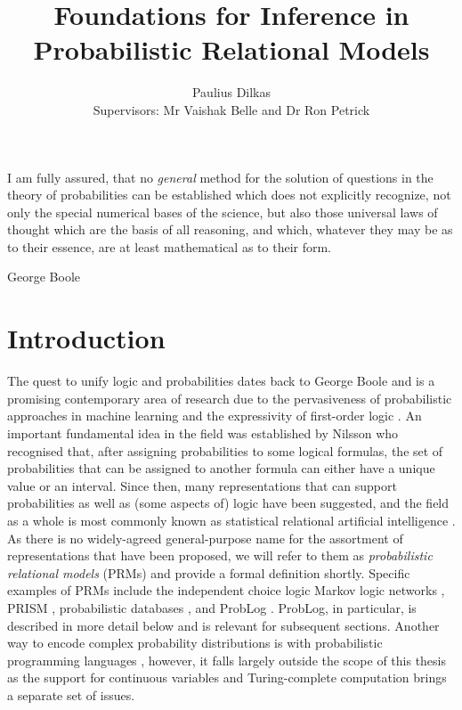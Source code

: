 \documentclass{article}
\title{Foundations for Inference in Probabilistic Relational Models}
\author{Paulius Dilkas \\[1ex] {\small Supervisors: Mr Vaishak Belle and Dr Ron
    Petrick}}
\affil{School of Informatics, University of Edinburgh}
\begin{document}
\maketitle

\epigraph{I am fully assured, that no \emph{general} method for the solution of
  questions in the theory of probabilities can be established which does not
  explicitly recognize, not only the special numerical bases of the science, but
  also those universal laws of thought which are the basis of all reasoning, and
  which, whatever they may be as to their essence, are at least mathematical as
  to their form.}{George Boole \cite{boole1854v}}

\section{Introduction}

The quest to unify logic and probabilities dates back to George Boole
\cite{boole1957laws} and is a promising contemporary area of research due to the
pervasiveness of probabilistic approaches in machine learning and the
expressivity of first-order logic
\cite{DBLP:series/sci/BrazAR08,DBLP:journals/cacm/Russell15}. An important
fundamental idea in the field was established by Nilsson
\cite{DBLP:journals/ai/Nilsson86} who recognised that, after assigning
probabilities to some logical formulas, the set of probabilities that can be
assigned to another formula can either have a unique value or an interval.
Since then, many representations that can support probabilities as well as (some
aspects of) logic have been suggested, and the field as a whole is most commonly
known as statistical relational artificial intelligence
\cite{DBLP:series/synthesis/2016Raedt}. As there is no widely-agreed
general-purpose name for the assortment of representations that have been
proposed, we will refer to them as \emph{probabilistic relational models} (PRMs)
and provide a formal definition shortly. Specific examples of PRMs include the
independent choice logic \cite{DBLP:journals/ai/Poole97} Markov logic networks
\cite{DBLP:journals/ml/RichardsonD06}, PRISM \cite{DBLP:conf/ijcai/SatoK97},
probabilistic databases \cite{DBLP:series/synthesis/2011Suciu}, and ProbLog
\cite{DBLP:conf/ijcai/RaedtKT07}. ProbLog, in particular, is described in more
detail below and is relevant for subsequent sections. Another way to encode
complex probability distributions is with probabilistic programming languages
\cite{DBLP:conf/icse/GordonHNR14}, however, it falls largely outside the scope of
this thesis as the support for continuous variables and Turing-complete
computation brings a separate set of issues.
\end{document}
